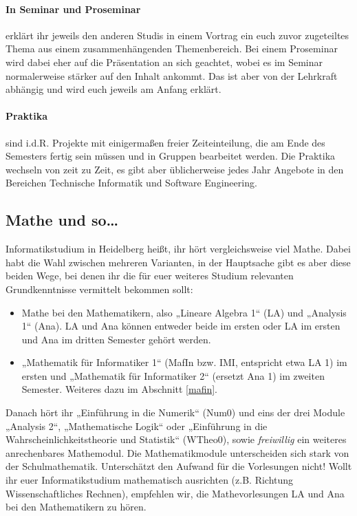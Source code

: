 \paragraph*{In Seminar und Proseminar} erklärt ihr jeweils den anderen Studis in einem Vortrag ein euch zuvor zugeteiltes Thema aus einem zusammenhängenden Themenbereich. Bei einem Proseminar wird dabei eher auf die Präsentation an sich geachtet, wobei es im Seminar normalerweise stärker auf den Inhalt ankommt. Das ist aber von der Lehrkraft abhängig und wird euch jeweils am Anfang erklärt.

\paragraph*{Praktika} sind i.d.R. Projekte mit einigermaßen freier Zeiteinteilung, die am Ende des Semesters fertig sein müssen und in Gruppen bearbeitet werden. Die Praktika wechseln von zeit zu Zeit, es gibt aber üblicherweise jedes Jahr Angebote in den Bereichen Technische Informatik und Software Engineering.

\subsection{Mathe und so\dots}

Informatikstudium in Heidelberg heißt, ihr hört vergleichsweise viel Mathe. Dabei habt die Wahl zwischen mehreren Varianten, in der Hauptsache gibt es aber diese beiden Wege, bei denen ihr die für euer weiteres Studium relevanten Grundkenntnisse vermittelt bekommen sollt:

\begin{itemize}
	\item Mathe bei den Mathematikern, also „Lineare Algebra 1“ (\gls{LA}) und „Analysis 1“ (\gls{Ana}). LA und Ana können entweder beide im ersten oder LA im ersten und Ana im dritten Semester gehört werden.
	\item „Mathematik für Informatiker 1“ (\gls{MafIn} bzw. IMI, entspricht etwa LA 1) im ersten und „Mathematik für Informatiker 2“ (ersetzt Ana 1) im zweiten Semester. Weiteres dazu im Abschnitt \autoref{mafin}.
\end{itemize}

Danach hört ihr „Einführung in die Numerik“ (\gls{Num0}) und eins der drei Module „Analysis 2“, „Mathematische Logik“ oder „Einführung in die Wahrscheinlichkeitstheorie und Statistik“ (\gls{WTheo0}), sowie \emph{freiwillig} ein weiteres anrechenbares Mathemodul. Die Mathematikmodule unterscheiden sich stark von der Schulmathematik. Unterschätzt den Aufwand für die Vorlesungen nicht! Wollt ihr euer Informatikstudium mathematisch ausrichten (z.B. Richtung Wissenschaftliches Rechnen), empfehlen wir, die Mathevorlesungen LA und Ana bei den Mathematikern zu hören.

